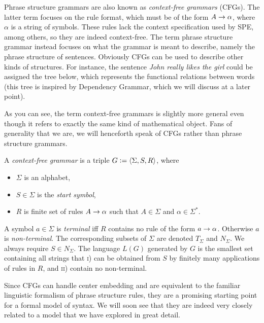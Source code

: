 Phrase structure grammars are also known as \emph{context-free grammars} (CFGs).
The latter term focuses on the rule format, which must be of the form $A \rightarrow \alpha$, where $\alpha$ is a string of symbols.
These rules lack the context specification used by SPE, among others, so they are indeed context-free.
The term phrase structure grammar instead focuses on what the grammar is meant to describe, namely the phrase structure of sentences.
Obviously CFGs can be used to describe other kinds of structures.
For instance, the sentence \emph{John really likes the girl} could be assigned the tree below, which represents the functional relations between words (this tree is inspired by Dependency Grammar, which we will discuss at a later point).
%
\begin{center}
    
\end{center}
%
As you can see, the term context-free grammars is slightly more general even though it refers to exactly the same kind of mathematical object.
Fans of generality that we are, we will henceforth speak of CFGs rather than phrase structure grammars.
%
\begin{definition}[CFG]
    A \emph{context-free grammar} is a triple $G \mathrel{\mathop:}= \left \langle \Sigma,S,R \right \rangle $, where
    \begin{itemize}
        \item $\Sigma$ is an alphabet,
        \item $S \in \Sigma$ is the \emph{start symbol},
        \item $R$ is finite set of rules $A \rightarrow \alpha$ such that $A \in \Sigma$ and $\alpha \in \Sigma^*$.
    \end{itemize}
    A symbol $a \in \Sigma$ is \emph{terminal} iff $R$ contains no rule of the form $a \rightarrow \alpha$.
    Otherwise $a$ is \emph{non-terminal}.
    The corresponding subsets of $\Sigma$ are denoted $T_\Sigma$ and $N_\Sigma$.
    We always require $S \in N_\Sigma$.
    The language $L(G)$ generated by $G$ is the smallest set containing all strings that \textsc{i}) can be obtained from $S$ by finitely many applications of rules in $R$, and \textsc{ii}) contain no non-terminal.
\end{definition}

Since CFGs can handle center embedding and are equivalent to the familiar linguistic formalism of phrase structure rules, they are a promising starting point for a formal model of syntax.
We will soon see that they are indeed very closely related to a model that we have explored in great detail.

